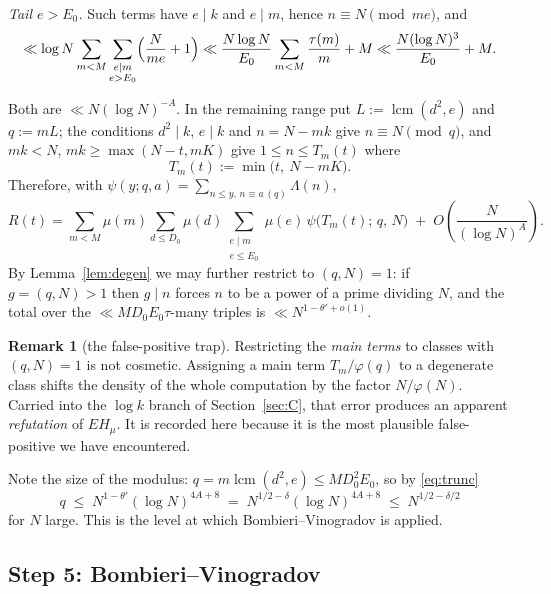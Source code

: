 \documentclass[11pt,a4paper]{article}
\theoremstyle{plain}
\theoremstyle{definition}
\newtheorem{remark}[theorem]{Remark}
\DeclareMathOperator{\lcm}{lcm}
\begin{document}
\emph{Tail $e>E_0$.} Such terms have $e\mid k$ and $e\mid m$, hence
$n\equiv N\pmod{me}$, and
\[
  \ll \log N\sum_{m<M}\sum_{\substack{e\mid m\\ e>E_0}}
      \Bigl(\frac{N}{me}+1\Bigr)
  \ll \frac{N\log N}{E_0}\sum_{m<M}\frac{\tau(m)}{m} + M
  \ll \frac{N(\log N)^{3}}{E_0}+M .
\]

Both are $\ll N(\log N)^{-A}$. In the remaining range put
$L:=\lcm(d^2,e)$ and $q:=mL$; the conditions $d^2\mid k$, $e\mid k$ and
$n=N-mk$ give $n\equiv N\pmod q$, and $mk<N$, $mk\ge\max(N-t,mK)$ give
$1\le n\le T_m(t)$ where
\begin{equation}\label{eq:Tm}
  T_m(t) := \min\bigl(t,\ N-mK\bigr).
\end{equation}
Therefore, with $\psi(y;q,a)=\sum_{n\le y,\,n\equiv a\,(q)}\Lambda(n)$,
\begin{equation}\label{eq:R2}
  R(t) = \sum_{m<M}\mu(m)\sum_{d\le D_0}\mu(d)
         \sum_{\substack{e\mid m\\ e\le E_0}}\mu(e)\,
         \psi\bigl(T_m(t);\,q,\,N\bigr)
         \;+\;O\!\left(\frac{N}{(\log N)^{A}}\right).
\end{equation}
By Lemma~\ref{lem:degen} we may further restrict to $(q,N)=1$: if
$g=(q,N)>1$ then $g\mid n$ forces $n$ to be a power of a prime dividing
$N$, and the total over the $\ll MD_0E_0\tau$-many triples is
$\ll N^{1-\theta'+o(1)}$.

\begin{remark}[the false-positive trap]\label{rem:trap}
Restricting the \emph{main terms} to classes with $(q,N)=1$ is not
cosmetic. Assigning a main term $T_m/\varphi(q)$ to a degenerate class
shifts the density of the whole computation by the factor
$N/\varphi(N)$. Carried into the $\log k$ branch of
Section~\ref{sec:C}, that error produces an apparent \emph{refutation}
of $EH_\mu$. It is recorded here because it is the most plausible
false-positive we have encountered.
\end{remark}

Note the size of the modulus: $q=m\lcm(d^2,e)\le MD_0^2E_0$, so by
\eqref{eq:trunc}
\begin{equation}\label{eq:level}
  q \;\le\; N^{1-\theta'}(\log N)^{4A+8} \;=\; N^{1/2-\delta}(\log N)^{4A+8}
  \;\le\; N^{1/2-\delta/2}
\end{equation}
for $N$ large. This is the level at which Bombieri--Vinogradov is
applied.

\subsection{Step 5: Bombieri--Vinogradov}
\end{document}
